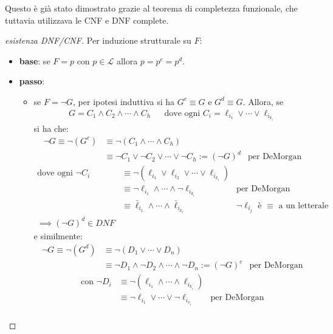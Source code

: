 Questo è già stato dimostrato grazie al teorema di completezza funzionale, che tuttavia utilizzava le CNF e DNF complete. 
\begin{proof}[esistenza DNF/CNF]
Per induzione strutturale su $F$:
\begin{itemize}
  \item \textbf{base}: se $F = p$ con $p \in \mathscr{L}$ allora $p = p^c = p^d$.
  \item \textbf{passo}:
    \begin{itemize}
      \item se $F = \neg G$, per ipotesi induttiva si ha $G^c \equiv G$ e $G^d \equiv G$. 
        Allora, se
        \begin{align*}
           G = C_1 \land C_2 \land \cdots \land C_h &&
          \text{dove ogni } C_i = \ell_{i_1} \lor \cdots \lor \ell_{i_{k_i}}
        \end{align*}
        si ha che:
        \begin{align*}
          \neg G \equiv \neg (G^c) & \equiv \neg (C_1 \land \cdots \land C_h) \\
                   & \equiv \neg C_1 \lor \neg C_2 \lor \cdots \lor \neg C_h := (\neg G)^d & \text{per DeMorgan}
        \end{align*}
        \begin{align*}
          \text{dove ogni } \neg C_i & \equiv \neg (\ell_{i_1} \lor \ell_{i_2} \lor \cdots \lor \ell_{i_{k_i}}) \\
                               & \equiv \neg \ell_{i_1} \land \cdots \land \neg \ell_{i_{k_i}} & \text{per DeMorgan} \\
                               & \equiv \bar \ell_{i_1} \land \cdots \land \bar \ell_{i_{k_i}} & \neg \ell_{i_j} \text{ è } \equiv \text{ a un letterale opposto} \\
          \implies (\neg G)^d \in DNF 
        \end{align*}
        e similmente:
        \begin{align*}
          \neg G \equiv \neg (G^d) & \equiv \neg (D_1 \lor \cdots \lor D_n) \\
                   & \equiv \neg D_1 \land \neg D_2 \land \cdots \land \neg D_n := (\neg G)^c & \text{per DeMorgan}
        \end{align*}
        \begin{align*}
          \text{con } \neg D_i & \equiv \neg (\ell_{i_1} \land \cdots \land \ell_{i_{k_i}}) \\
                               & \equiv \neg \ell_{i_1} \lor \cdots \lor \neg \ell_{i_{v_i}} & \text{per DeMorgan} \\

\end{align*}
\end{itemize}
\end{itemize}
\end{proof}

